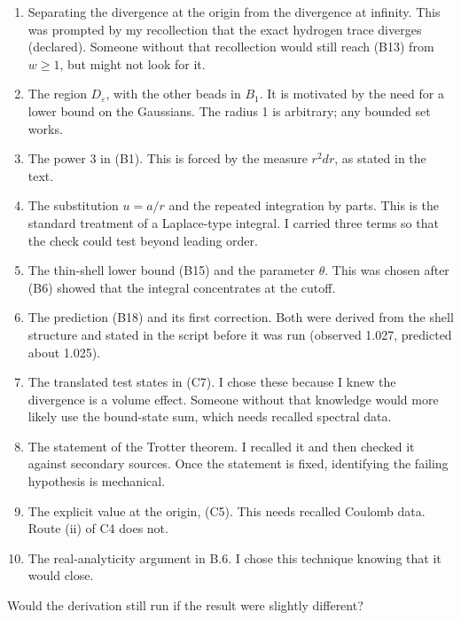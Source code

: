 \documentclass[11pt,a4paper]{article}
\providecommand{\tightlist}{\setlength{\itemsep}{0pt}\setlength{\parskip}{0pt}}
\begin{document}
\begin{enumerate}
\def\labelenumi{\arabic{enumi}.}
\tightlist
\item
  Separating the divergence at the origin from the divergence at infinity. This was prompted by my recollection that the exact hydrogen trace diverges (declared). Someone without that recollection would still reach (B13) from \(w\ge1\), but might not look for it.
\item
  The region \(D_\varepsilon\), with the other beads in \(B_1\). It is motivated by the need for a lower bound on the Gaussians. The radius 1 is arbitrary; any bounded set works.
\item
  The power 3 in (B1). This is forced by the measure \(r^2dr\), as stated in the text.
\item
  The substitution \(u=a/r\) and the repeated integration by parts. This is the standard treatment of a Laplace-type integral. I carried three terms so that the check could test beyond leading order.
\item
  The thin-shell lower bound (B15) and the parameter \(\theta\). This was chosen after (B6) showed that the integral concentrates at the cutoff.
\item
  The prediction (B18) and its first correction. Both were derived from the shell structure and stated in the script before it was run (observed 1.027, predicted about 1.025).
\item
  The translated test states in (C7). I chose these because I knew the divergence is a volume effect. Someone without that knowledge would more likely use the bound-state sum, which needs recalled spectral data.
\item
  The statement of the Trotter theorem. I recalled it and then checked it against secondary sources. Once the statement is fixed, identifying the failing hypothesis is mechanical.
\item
  The explicit value at the origin, (C5). This needs recalled Coulomb data. Route (ii) of C4 does not.
\item
  The real-analyticity argument in B.6. I chose this technique knowing that it would close.
\end{enumerate}

Would the derivation still run if the result were slightly different?
\end{document}

